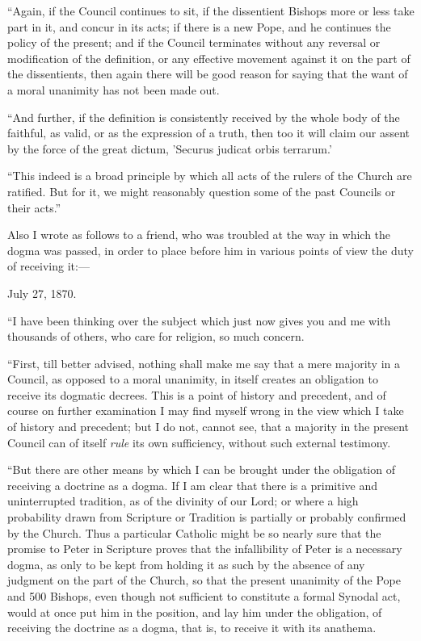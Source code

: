 ``Again, if the Council continues to sit, if the dissentient
Bishops more or less take part in it, and concur in its acts; if
there is a new Pope, and he continues the policy of the present; and if
the Council terminates without any reversal or modification of the
definition, or any effective movement against it on the part of the
dissentients, then again there will be good reason for saying that the
want of a moral unanimity has not been made out.

``And further, if the definition is consistently received by the
whole body of the faithful, as valid, or as the expression of a truth,
then too it will claim our assent by the force of the great dictum, 'Securus
judicat orbis terrarum.'

``This indeed is a broad principle by which all acts of the
rulers of the Church are ratified. But for it, we might reasonably
question some of the past Councils or their acts.''

Also I wrote as follows to a friend, who was troubled at the way in
which the dogma was passed, in order to place before him in various
points of view the duty of receiving it:—

July 27, 1870.

``I have been thinking over the subject which just now gives you and
me with thousands of others, who care for religion, so much concern.

``First, till better advised, nothing shall make me say that a
mere majority in a Council, as opposed to a moral unanimity, in itself
creates an obligation to receive its dogmatic decrees. This is a point
of history and precedent, and of course on further examination I may
find myself wrong in the view which I take of history and precedent; but I do not, cannot see, that a majority in the present
Council can of itself \emph{rule} its own sufficiency, without such
external testimony.

``But there are other means by which I can be brought under the
obligation of receiving a doctrine as a dogma. If I am clear that there
is a primitive and uninterrupted tradition, as of the divinity of our
Lord; or where a high probability drawn from Scripture or Tradition is
partially or probably confirmed by the Church. Thus a particular
Catholic might be so nearly sure that the promise to Peter in Scripture
proves that the infallibility of Peter is a necessary dogma, as only to
be kept from holding it as such by the absence of any judgment on the
part of the Church, so that the present unanimity of the Pope and 500
Bishops, even though not sufficient to constitute a formal Synodal act,
would at once put him in the position, and lay him under the obligation,
of receiving the doctrine as a dogma, that is, to receive it with its
anathema.

